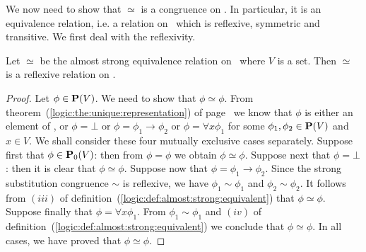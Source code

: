 We now need to show that $\simeq$ is a congruence on \pv. In
particular, it is an equivalence relation, i.e. a relation on \pv\
which is reflexive, symmetric and transitive. We first deal with the
reflexivity.

\begin{prop}\label{logic:prop:almost:strong:reflexive}
Let $\simeq$ be the almost strong equivalence relation on \pv\ where
$V$ is a set. Then $\simeq$ is a reflexive relation on \pv.
\end{prop}
\begin{proof}
Let $\phi\in\mbox{${\bf P}(V)$}$. We need to show that $\phi\simeq\phi$. From
theorem~(\ref{logic:the:unique:representation}) of
page~\pageref{logic:the:unique:representation} we know that $\phi$
is either an element of \pvo, or $\phi=\bot$ or
$\phi=\phi_{1}\to\phi_{2}$ or $\phi=\forall x\phi_{1}$ for some
$\phi_{1},\phi_{2}\in\mbox{${\bf P}(V)$}$ and $x\in V$. We shall consider these four
mutually exclusive cases separately. Suppose first that
$\phi\in\mbox{${\bf P}_{0}(V)$}$: then from $\phi=\phi$ we obtain $\phi\simeq\phi$.
Suppose next that $\phi=\bot$: then it is clear that
$\phi\simeq\phi$. Suppose now that $\phi=\phi_{1}\to\phi_{2}$. Since
the strong substitution congruence $\sim$ is reflexive, we have
$\phi_{1}\sim\phi_{1}$ and $\phi_{2}\sim\phi_{2}$. It follows from
$(iii)$ of definition~(\ref{logic:def:almost:strong:equivalent})
that $\phi\simeq\phi$. Suppose finally that $\phi=\forall
x\phi_{1}$. From $\phi_{1}\sim\phi_{1}$ and $(iv)$ of
definition~(\ref{logic:def:almost:strong:equivalent}) we conclude
that $\phi\simeq\phi$. In all cases, we have proved that
$\phi\simeq\phi$.
\end{proof}


